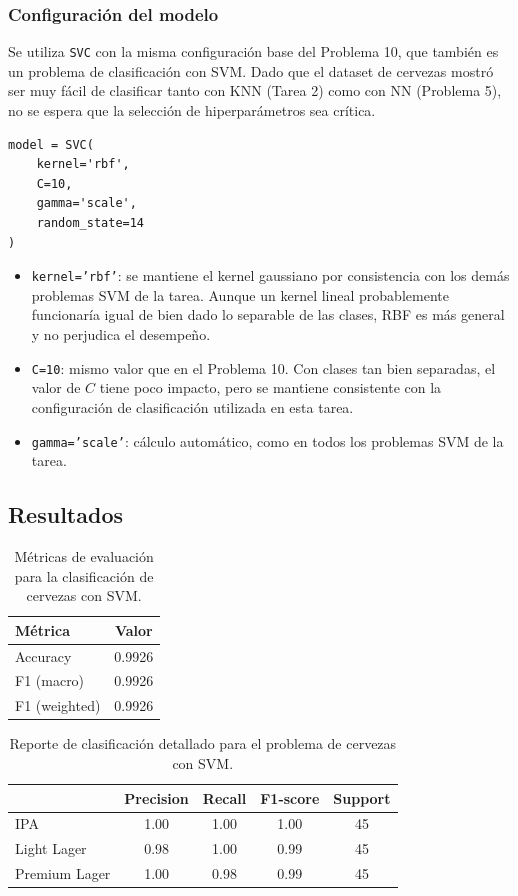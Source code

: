 \documentclass{article}
\begin{document}
\subsubsection{Configuración del modelo}

Se utiliza \texttt{SVC} con la misma configuración base del Problema 10, que también es un problema de clasificación con SVM. Dado que el dataset de cervezas mostró ser muy fácil de clasificar tanto con KNN (Tarea 2) como con NN (Problema 5), no se espera que la selección de hiperparámetros sea crítica.

\begin{lstlisting}
model = SVC(
    kernel='rbf',
    C=10,
    gamma='scale',
    random_state=14
)
\end{lstlisting}

\begin{itemize}
    \item \texttt{kernel='rbf'}: se mantiene el kernel gaussiano por consistencia con los demás problemas SVM de la tarea. Aunque un kernel lineal probablemente funcionaría igual de bien dado lo separable de las clases, RBF es más general y no perjudica el desempeño.
    \item \texttt{C=10}: mismo valor que en el Problema 10. Con clases tan bien separadas, el valor de $C$ tiene poco impacto, pero se mantiene consistente con la configuración de clasificación utilizada en esta tarea.
    \item \texttt{gamma='scale'}: cálculo automático, como en todos los problemas SVM de la tarea.
\end{itemize}

\subsection{Resultados}

\begin{table}[H]
\centering
\begin{tabular}{lc}
\hline
\textbf{Métrica} & \textbf{Valor} \\
\hline
Accuracy         & 0.9926 \\
F1 (macro)       & 0.9926 \\
F1 (weighted)    & 0.9926 \\
\hline
\end{tabular}
\caption{Métricas de evaluación para la clasificación de cervezas con SVM.}
\label{tab:p11_resultados}
\end{table}

\begin{table}[H]
\centering
\begin{tabular}{lcccc}
\hline
& \textbf{Precision} & \textbf{Recall} & \textbf{F1-score} & \textbf{Support} \\
\hline
IPA           & 1.00 & 1.00 & 1.00 & 45 \\
Light Lager   & 0.98 & 1.00 & 0.99 & 45 \\
Premium Lager & 1.00 & 0.98 & 0.99 & 45 \\
\hline
\end{tabular}
\caption{Reporte de clasificación detallado para el problema de cervezas con SVM.}
\label{tab:p11_report}
\end{table}
\end{document}
